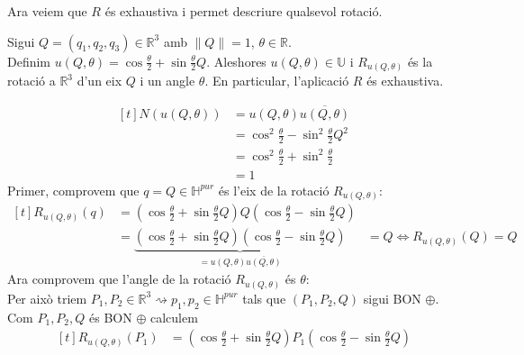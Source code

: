 \documentclass[../main.tex]{subfiles}
\begin{document}
	Ara veiem que $R$ és exhaustiva i permet descriure qualsevol rotació.
	\begin{teorema}
		Sigui $Q = (q_1, q_2, q_3) \in \mathbb{R}^3$ amb $\left\lVert Q \right\rVert = 1$, $\theta \in \mathbb{R}$.\\
		Definim $u(Q, \theta) = \cos{\frac{\theta}{2}} + \sin{\frac{\theta}{2}}Q$. Aleshores $u(Q, \theta) \in \mathbb{U}$ i $R_{u(Q, \theta)}$ és la rotació a $\mathbb{R}^3$ d'un eix $Q$ i un angle $\theta$. En particular, l'aplicació $R$ és exhaustiva.
	\end{teorema}
	\begin{demostracio}
		\begin{displaymath}
			\begin{aligned}[t]
				N(u(Q, \theta)) &= u(Q, \theta) \overline{u(Q, \theta)}\\
								&= \cos^2{\frac{\theta}{2}} - \sin^2{\frac{\theta}{2}} Q^2\\
								&= \cos^2{\frac{\theta}{2}} + \sin^2{\frac{\theta}{2}}\\
								&= 1
			\end{aligned}
		\end{displaymath}
		Primer, comprovem que $q = Q \in \mathbb{H}^{pur}$ és l'eix de la rotació $R_{u(Q, \theta)}$:\\
		\begin{displaymath}
			\begin{aligned}[t]
				R_{u(Q, \theta)}(q) &= (\cos{\frac{\theta}{2}} + \sin{\frac{\theta}{2}}Q)Q(\cos{\frac{\theta}{2}} - \sin{\frac{\theta}{2}}Q)\\
									&= \underbrace{(\cos{\frac{\theta}{2}} + \sin{\frac{\theta}{2}}Q)(\cos{\frac{\theta}{2}} - \sin{\frac{\theta}{2}}Q)}_{ = u(Q, \theta)\overline{u(Q, \theta)}}
									&= Q \iff R_{u(Q, \theta)}(Q) = Q
			\end{aligned}
		\end{displaymath}
		Ara comprovem que l'angle de la rotació $R_{u(Q,\theta)}$ és $\theta$:\\
		Per això triem $P_1, P_2 \in \mathbb{R}^3 \rightsquigarrow p_1, p_2 \in \mathbb{H}^{pur}$ tals que $(P_1, P_2, Q)$ sigui BON $\oplus$.\\
		Com $P_1, P_2, Q$ és BON $\oplus$ calculem
		\begin{displaymath}
			\begin{aligned}[t]
				R_{u(Q, \theta)}(P_1)
									&= (\cos{\frac{\theta}{2}} + \sin{\frac{\theta}{2}}Q)P_1(\cos{\frac{\theta}{2}} - \sin{\frac{\theta}{2}}Q)\\

\end{aligned}
\end{displaymath}
\end{demostracio}
\end{document}
